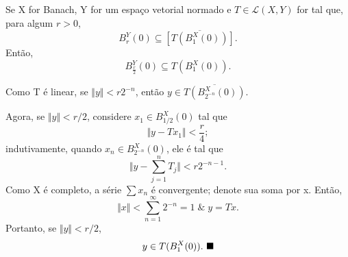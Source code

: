 \documentclass[../functional_analysis.tex]{subfiles}
\begin{document}
\begin{lemma*}
	Se X for Banach, Y for um espaço vetorial normado e \(T\in \mathcal{L}(X, Y)\) for tal que, para algum \(r> 0\),
	\[
		B_{r}^{Y}(0)\subseteq \overline{[T(B_{1}^{X}(0))]}.
	\]
	Então,
	\[
		B_{\frac{r}{2}}^{Y}(0)\subseteq T(B_{1}^{X}(0)).
	\]
\end{lemma*}
\begin{proof*}
	Como T é linear, se \(\Vert y \Vert < r2^{-n}\), então \(y\in \overline{T(B_{2^{-n}}^{X}(0))}.\)

	Agora, se \(\Vert y \Vert < r/2\), considere \(x_1\in B_{1/2}^{X}(0)\) tal que
	\[
		\Vert y-Tx_1 \Vert < \frac{r}{4};
	\]
	indutivamente, quando \(x_{n}\in B_{2^{-n}}^{X}(0)\), ele é tal que
	\[
		\biggl\Vert y- \sum\limits_{j=1}^{n}T_{j} \biggr\Vert < r2^{-n-1}.
	\]
	Como X é completo, a série \(\sum x_{n}\) é convergente; denote sua soma por x. Então,
	\[
		\Vert x \Vert < \sum\limits_{n=1}^{\infty}2^{-n}=1\;\&\; y = Tx.
	\]
	Portanto, se \(\Vert y \Vert < r/2\),
	\[
		y\in T(B_{1}^{X}(0)).\text{ $\blacksquare$}
	\]

\end{proof*}
\end{document}
